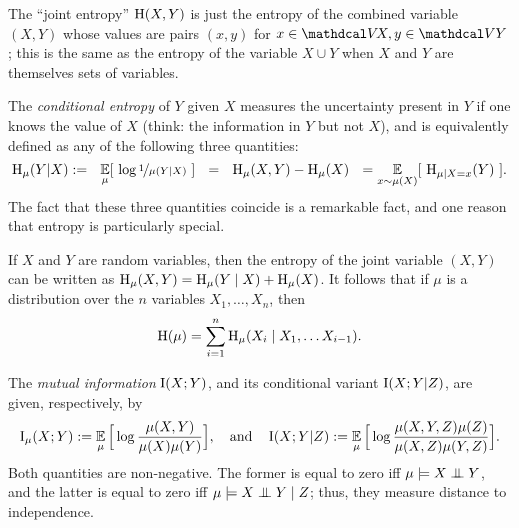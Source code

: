 The ``joint entropy'' $\operatorname{\mathrm{H}}(X,Y)$ is just the entropy of the combined variable $(X,Y)$ whose values are pairs $(x,y)$ for $x \in \V\!X,y \in \V Y$; this is the same as the entropy of the variable $X \cup Y$ when $X$ and $Y$ are themselves sets of variables. 

The \emph{conditional entropy} of $Y$ given $X$
measures the uncertainty present in $Y$ if one knows the value of $X$
(think: the information in $Y$ but not $X$),
and is equivalently defined as any of the following three quantities:
\[
\operatorname{\mathrm{H}}_\mu( Y | X) :=
    ~~
    \operatorname*{\mathbb{E}}_{\mu} [~\log \nicefrac1{\mu(Y | X)}~]
    ~~=~~\operatorname{\mathrm{H}}_\mu(X,Y) - \operatorname{\mathrm{H}}_\mu(X)
    ~~=\operatorname*{\mathbb{E}}_{x \sim \mu(X)} [~\operatorname{\mathrm{H}}_{\mu \mid X{=}x}(Y)~]    
.
\]
The fact that these three quantities coincide is a remarkable fact,
and one reason that entropy is particularly special. 

\begin{fact}\label{fact:entropy-chain-rule}
    If $X$ and $Y$ are random variables, then the entropy of the joint
   variable $(X,Y)$ can be written as $\operatorname{\mathrm{H}}_\mu(X,Y) = 
\operatorname{\mathrm{H}}_\mu( Y \mid X) + \operatorname{\mathrm{H}}_\mu(X)$.
It follows that if $\mu$ is a
       distribution over the $n$ variables $X_1, \ldots, X_n$,  then
	\[ \operatorname{\mathrm{H}}(\mu) = \sum_{i = 1}^n \operatorname{\mathrm{H}}_\mu(X_i \mid X_1, \ldots X_{i-1}). \]
\end{fact}

The \emph{mutual information} $\operatorname{\mathrm{I}}(X;Y)$,
and its conditional variant $\operatorname{\mathrm{I}}(X;Y|Z)$, 
are given, respectively, by
\[
    \operatorname{\mathrm{I}}_\mu(X;Y) :=
        \operatorname*{\mathbb{E}}_{\mu} \Big[ \log \frac{\mu(X,Y)}{\mu(X) \mu(Y)}\Big],
    \quad\text{and}\quad
    \operatorname{\mathrm{I}}(X;Y|Z):= 
        \operatorname*{\mathbb{E}}_{\mu} \Big[ \log \frac{\mu(X,Y,Z)\mu(Z)}{\mu(X,Z) \mu(Y,Z)}\Big].
\]
Both quantities are non-negative.
The former is equal to zero iff $\mu \models X \mathrel{\perp\mspace{-10mu}\perp} Y$, and the latter is equal to zero iff $\mu \models X \mathrel{\perp\mspace{-10mu}\perp} Y \mid Z$;
thus, they measure distance to independence. 


